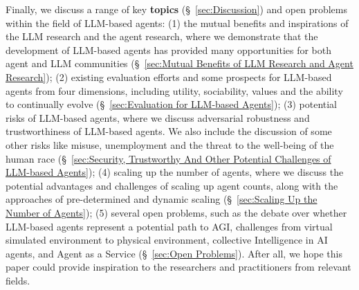 \documentclass{article}
\begin{document}
Finally, we discuss a range of key \textbf{topics} (\S \ \ref{sec:Discussion}) and open problems within the field of LLM-based agents: (1) the mutual benefits and inspirations of the LLM research and the agent research, where we demonstrate that the development of LLM-based agents has provided many opportunities for both agent and LLM communities (\S \ \ref{sec:Mutual Benefits of LLM Research and Agent Research}); 
(2) existing evaluation efforts and some prospects for LLM-based agents from four dimensions, including utility, sociability, values and the ability to continually evolve (\S \ \ref{sec:Evaluation for LLM-based Agents}); 
(3) potential risks of LLM-based agents, where we discuss adversarial robustness and trustworthiness of LLM-based agents. We also include the discussion of some other risks like misuse, unemployment and the threat to the well-being of the human race (\S \ \ref{sec:Security, Trustworthy And Other Potential Challenges of LLM-based Agents}); 
(4) scaling up the number of agents, where we discuss the potential advantages and challenges of scaling up agent counts, along with the approaches of pre-determined and dynamic scaling (\S \ \ref{sec:Scaling Up the Number of Agents}); (5) several open problems, such as the debate over whether LLM-based agents represent a potential path to AGI, challenges from virtual simulated environment to physical environment, collective Intelligence in AI agents, and Agent as a Service (\S \ \ref{sec:Open Problems}). After all, we hope this paper could provide inspiration to the researchers and practitioners from relevant fields. 




\end{document}
